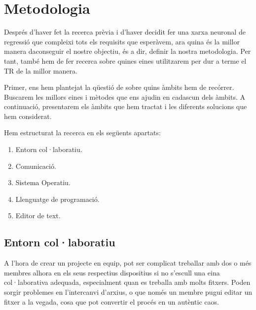 \chapter{Metodologia}
\label{c:Metodologia}

Després d'haver fet la recerca prèvia i d'haver decidit fer una xarxa neuronal de regressió que compleixi tots els requisits que esperàvem, ara quina és la millor manera daconseguir el nostre objectiu, és a dir, definir la nostra metodologia. Per tant, també hem de fer recerca sobre quines eines utilitzarem per dur a terme el TR de la millor manera.

Primer, ens hem plantejat la qüestió de sobre quins àmbits hem de recórrer. Buscarem les millors eines i mètodes que ens ajudin en cadascun dels àmbits. A continuació, presentarem els àmbits que hem tractat i les diferents solucions que hem considerat.

Hem estructurat la recerca en els següents apartats:
\begin{enumerate}
 \item Entorn col·laboratiu.
 \item Comunicació.
 \item Sistema Operatiu.
 \item Llenguatge de programació.
 \item Editor de text.
\end{enumerate}
%


\section{Entorn col·laboratiu}\label{sec:4.3}
A l’hora de crear un projecte en equip, pot ser complicat treballar amb dos o més membres alhora en els seus respectius dispositius si no s’escull una eina col·laborativa adequada, especialment quan es treballa amb molts fitxers. Poden sorgir problemes en l’intercanvi d’arxius, o que només un membre pugui editar un fitxer a la vegada, cosa que pot convertir el procés en un autèntic caos.


